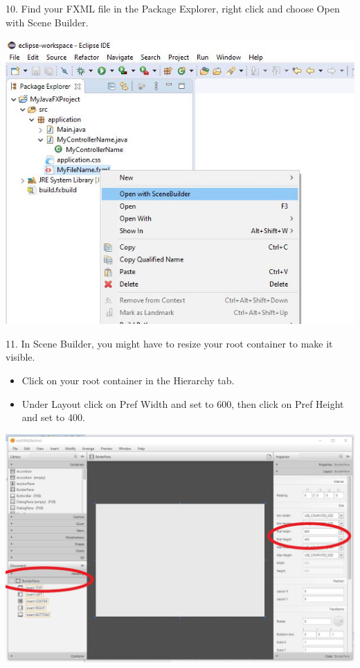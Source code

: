 \documentclass{beamer}
\begin{document}
\begin{frame}        
        10.  Find your FXML file in the Package Explorer, right click and choose Open with Scene Builder.

        \begin{center}
            \includegraphics[scale=.35]{open_with_scene_builder.jpg}
        \end{center}
     
\end{frame}

\begin{frame}        
        11.  In Scene Builder, you might have to resize your root container to make it visible.
        
        \begin{itemize}
            \item Click on your root container in the Hierarchy tab.
            \item Under Layout click on Pref Width and set to 600, then click on Pref Height and set to 400. 
        \end{itemize}
        

        \begin{center}
            \includegraphics[scale=.2]{resize.jpg}
        \end{center}
           
\end{frame}
\end{document}
